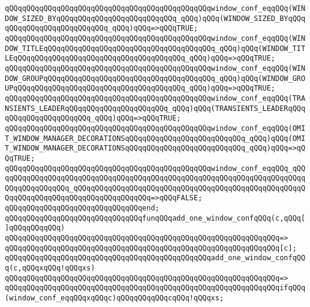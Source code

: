 \verb|qQQqqQQqqQQqqQQqqQQqqQQqqQQqqQQqqQQqqQQqqQQqqQQqwindow_conf_eqqQQq(WINDOW_SIZED_BYqQQqqQQqqQQqqQQqqQQqqQQqqQQq_qQQq)qQQq(WINDOW_SIZED_BYqQQqqQQqqQQqqQQqqQQqqQQqqQQq_qQQq)qQQq=>qQQqTRUE;|\newline
\verb|qQQqqQQqqQQqqQQqqQQqqQQqqQQqqQQqqQQqqQQqqQQqqQQqwindow_conf_eqqQQq(WINDOW_TITLEqQQqqQQqqQQqqQQqqQQqqQQqqQQqqQQqqQQqqQQq_qQQq)qQQq(WINDOW_TITLEqQQqqQQqqQQqqQQqqQQqqQQqqQQqqQQqqQQqqQQq_qQQq)qQQq=>qQQqTRUE;|\newline
\verb|qQQqqQQqqQQqqQQqqQQqqQQqqQQqqQQqqQQqqQQqqQQqqQQqwindow_conf_eqqQQq(WINDOW_GROUPqQQqqQQqqQQqqQQqqQQqqQQqqQQqqQQqqQQqqQQq_qQQq)qQQq(WINDOW_GROUPqQQqqQQqqQQqqQQqqQQqqQQqqQQqqQQqqQQqqQQq_qQQq)qQQq=>qQQqTRUE;|\newline
\verb|qQQqqQQqqQQqqQQqqQQqqQQqqQQqqQQqqQQqqQQqqQQqqQQqwindow_conf_eqqQQq(TRANSIENTS_LEADERqQQqqQQqqQQqqQQqqQQqqQQq_qQQq)qQQq(TRANSIENTS_LEADERqQQqqQQqqQQqqQQqqQQqqQQq_qQQq)qQQq=>qQQqTRUE;|\newline
\verb|qQQqqQQqqQQqqQQqqQQqqQQqqQQqqQQqqQQqqQQqqQQqqQQqwindow_conf_eqqQQq(OMIT_WINDOW_MANAGER_DECORATIONSqQQqqQQqqQQqqQQqqQQqqQQqqQQq_qQQq)qQQq(OMIT_WINDOW_MANAGER_DECORATIONSqQQqqQQqqQQqqQQqqQQqqQQqqQQq_qQQq)qQQq=>qQQqTRUE;|\newline
\verb|qQQqqQQqqQQqqQQqqQQqqQQqqQQqqQQqqQQqqQQqqQQqqQQqwindow_conf_eqqQQq_qQQqqQQqqQQqqQQqqQQqqQQqqQQqqQQqqQQqqQQqqQQqqQQqqQQqqQQqqQQqqQQqqQQqqQQqqQQqqQQqqQQqqQQq_qQQqqQQqqQQqqQQqqQQqqQQqqQQqqQQqqQQqqQQqqQQqqQQqqQQqqQQqqQQqqQQqqQQqqQQqqQQqqQQqqQQqqQQq=>qQQqFALSE;|\newline
\verb|qQQqqQQqqQQqqQQqqQQqqQQqqQQqqQQqend;|\newline
\newline
\newline
\verb|qQQqqQQqqQQqqQQqqQQqqQQqqQQqqQQqfunqQQqadd_one_window_confqQQq(c,qQQq[]qQQqqQQqqQQq)|\newline
\verb|qQQqqQQqqQQqqQQqqQQqqQQqqQQqqQQqqQQqqQQqqQQqqQQqqQQqqQQqqQQqqQQq=>|\newline
\verb|qQQqqQQqqQQqqQQqqQQqqQQqqQQqqQQqqQQqqQQqqQQqqQQqqQQqqQQqqQQqqQQq[c];|\newline
\newline
\verb|qQQqqQQqqQQqqQQqqQQqqQQqqQQqqQQqqQQqqQQqqQQqqQQqadd_one_window_confqQQq(c,qQQqxqQQq!qQQqxs)|\newline
\verb|qQQqqQQqqQQqqQQqqQQqqQQqqQQqqQQqqQQqqQQqqQQqqQQqqQQqqQQqqQQqqQQq=>|\newline
\verb|qQQqqQQqqQQqqQQqqQQqqQQqqQQqqQQqqQQqqQQqqQQqqQQqqQQqqQQqqQQqqQQqifqQQq(window_conf_eqqQQqxqQQqc)qQQqqQQqqQQqcqQQq!qQQqxs;|\newline
